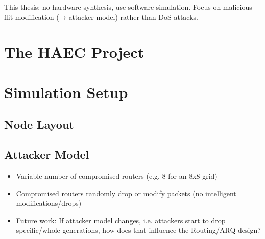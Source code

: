 \documentclass[
	paper=a4,
	fontsize=11pt,
	parskip=full %
]{scrreprt}
\begin{document}
    This thesis: no hardware synthesis, use software simulation. Focus on malicious flit modification (→ attacker model) rather than DoS attacks.

    \chapter{The HAEC Project}

    \chapter{Simulation Setup}
    \section{Node Layout}

    \section{Attacker Model}
    \begin{itemize}
        \item Variable number of compromised routers (e.g. 8 for an 8x8 grid)
        \item Compromised routers randomly drop or modify packets (no intelligent modifications/drops)
        \item Future work: If attacker model changes, i.e. attackers start to drop specific/whole generations,
            how does that influence the Routing/ARQ design?
    \end{itemize}
\end{document}
